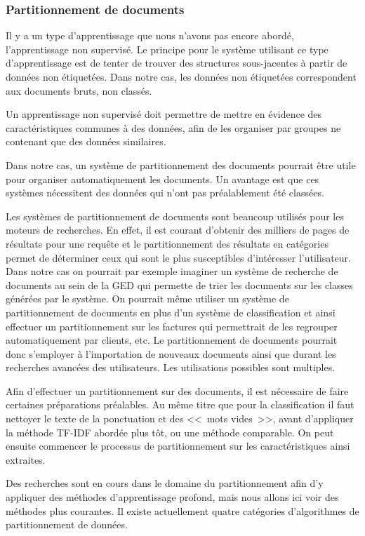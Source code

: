 \subsubsection{Partitionnement de documents}

Il y a un type d'apprentissage que nous n'avons pas encore abordé, l'apprentissage non supervisé.
Le principe pour le système utilisant ce type d'apprentissage est de tenter de trouver des structures sous-jacentes à partir de données non étiquetées.
Dans notre cas, les données non étiquetées correspondent aux documents bruts, non classés.

Un apprentissage non supervisé doit permettre de mettre en évidence des caractéristiques communes à des données, afin de les organiser par groupes ne contenant que des données similaires.

Dans notre cas, un système de partitionnement des documents pourrait être utile pour organiser automatiquement les documents.
Un avantage est que ces systèmes nécessitent des données qui n'ont pas préalablement été classées.

Les systèmes de partitionnement de documents sont beaucoup utilisés pour les moteurs de recherches.
En effet, il est courant d'obtenir des milliers de pages de résultats pour une requête et le partitionnement des résultats en catégories permet de déterminer ceux qui sont le plus susceptibles d'intéresser l'utilisateur.
Dans notre cas on pourrait par exemple imaginer un système de recherche de documents au sein de la GED qui permette de trier les documents sur les classes générées par le système.
On pourrait même utiliser un système de partitionnement de documents en plus d'un système de classification et ainsi effectuer un partitionnement sur les factures qui permettrait de les regrouper automatiquement par clients, etc.
Le partitionnement de documents pourrait donc s'employer à l'importation de nouveaux documents ainsi que durant les recherches avancées des utilisateurs.
Les utilisations possibles sont multiples.

Afin d'effectuer un partitionnement sur des documents, il est nécessaire de faire certaines préparations préalables.
Au même titre que pour la classification il faut nettoyer le texte de la ponctuation et des <<~mots vides~>>, avant d'appliquer la méthode TF-IDF abordée plus tôt, ou une méthode comparable.
On peut ensuite commencer le processus de partitionnement sur les caractéristiques ainsi extraites.

Des recherches sont en cours dans le domaine du partitionnement afin d'y appliquer des méthodes d'apprentissage profond, mais nous allons ici voir des méthodes plus courantes.
Il existe actuellement quatre catégories d'algorithmes de partitionnement de données.

